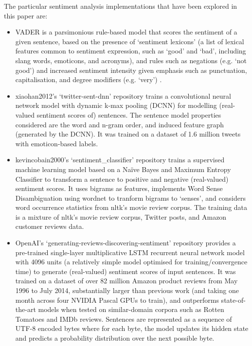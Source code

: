 \documentclass{report}
\begin{document}
The particular sentiment analysis implementations that have been explored in this paper are:
\begin{itemize}
	\item VADER is a parsimonious rule-based model that scores the sentiment of a given sentence, based on the presence of `sentiment lexicons' (a list of lexical features common to sentiment expression, such as `good' and `bad', including slang words, emoticons, and acronyms), and rules such as negations (e.g. `not good') and increased sentiment intensity given emphasis such as punctuation, capitalisation, and degree modifiers (e.g. `very') \cite{VADER}.
	\item xiaohan2012's `twitter-sent-dnn' repository trains a convolutional neural network model with dynamic k-max pooling (DCNN) for modelling (real-valued sentiment scores of) sentences.
		The sentence model properties considered are the word and n-gram order, and induced feature graph (generated by the DCNN).
		It was trained on a dataset of 1.6 million tweets with emoticon-based labels. \cite{kalchbrennerACL2014}
	\item kevincobain2000's `sentiment\_classifier' repository trains a supervised machine learning model based on a Na\"{i}ve Bayes and Maximum Entropy Classifier to transform a sentence to positive and negative (real-valued) sentiment scores.
		It uses bigrams as features, implements Word Sense Disambiguation using wordnet \cite{banerjee2002adapted} to tranform bigrams to `senses', and considers word occurrence statistics from nltk's movie review corpus.
		The training data is a mixture of nltk's movie review corpus, Twitter posts, and Amazon customer reviews data. \cite{kevincobain}
	\item OpenAI's `generating-reviews-discovering-sentiment' repository provides a pre-trained single-layer multiplicative LSTM recurrent neural network model with 4096 units (a relatively simple model optimised for training/convergence time) to generate (real-valued) sentiment scores of input sentences.
		It was trained on a dataset of over 82 million Amazon product reviews from May 1996 to July 2014, substantially larger than previous work (and taking one month across four NVIDIA Pascal GPUs to train), and outperforms state-of-the-art models when tested on similar-domain corpora such as Rotten Tomatoes and IMDb reviews.
		Sentences are represented as a sequence of UTF-8 encoded bytes where for each byte, the model updates its hidden state and predicts a probability distribution over the next possible byte. \cite{OpenAI}

\end{itemize}
\end{document}
